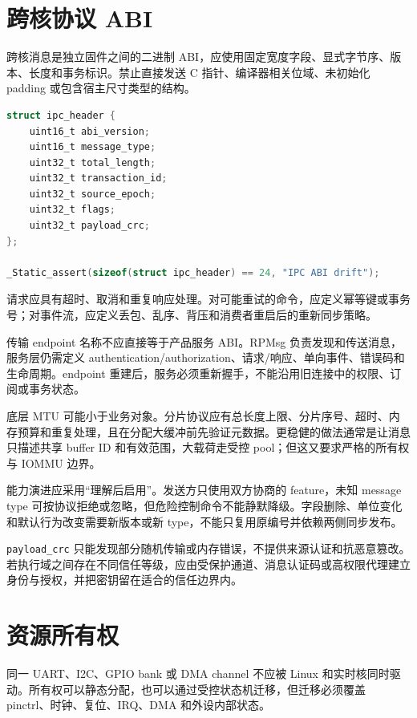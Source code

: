 \section{跨核协议 ABI}

跨核消息是独立固件之间的二进制 ABI，应使用固定宽度字段、显式字节序、版本、长度和事务标识。禁止直接发送 C 指针、编译器相关位域、未初始化 padding 或包含宿主尺寸类型的结构。

\begin{lstlisting}[language=C,caption={可演进的跨核消息头}]
struct ipc_header {
    uint16_t abi_version;
    uint16_t message_type;
    uint32_t total_length;
    uint32_t transaction_id;
    uint32_t source_epoch;
    uint32_t flags;
    uint32_t payload_crc;
};

_Static_assert(sizeof(struct ipc_header) == 24, "IPC ABI drift");
\end{lstlisting}

请求应具有超时、取消和重复响应处理。对可能重试的命令，应定义幂等键或事务号；对事件流，应定义丢包、乱序、背压和消费者重启后的重新同步策略。

传输 endpoint 名称不应直接等于产品服务 ABI。RPMsg 负责发现和传送消息\cite{linux-rpmsg-doc}，服务层仍需定义 authentication/authorization、请求/响应、单向事件、错误码和生命周期。endpoint 重建后，服务必须重新握手，不能沿用旧连接中的权限、订阅或事务状态。

底层 MTU 可能小于业务对象。分片协议应有总长度上限、分片序号、超时、内存预算和重复处理，且在分配大缓冲前先验证元数据。更稳健的做法通常是让消息只描述共享 buffer ID 和有效范围，大载荷走受控 pool；但这又要求严格的所有权与 IOMMU 边界。

能力演进应采用“理解后启用”。发送方只使用双方协商的 feature，未知 message type 可按协议拒绝或忽略，但危险控制命令不能静默降级。字段删除、单位变化和默认行为改变需要新版本或新 type，不能只复用原编号并依赖两侧同步发布。

\texttt{payload\_crc} 只能发现部分随机传输或内存错误，不提供来源认证和抗恶意篡改。若执行域之间存在不同信任等级，应由受保护通道、消息认证码或高权限代理建立身份与授权，并把密钥留在适合的信任边界内。

\section{资源所有权}

同一 UART、I2C、GPIO bank 或 DMA channel 不应被 Linux 和实时核同时驱动。所有权可以静态分配，也可以通过受控状态机迁移，但迁移必须覆盖 pinctrl、时钟、复位、IRQ、DMA 和外设内部状态。

